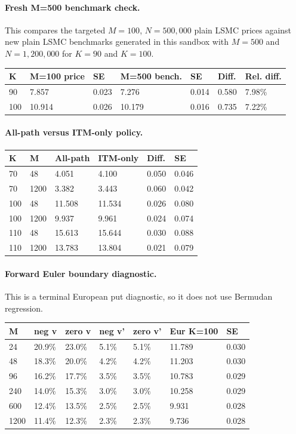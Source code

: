 \documentclass{article}
\begin{document}
\paragraph{Fresh M=500 benchmark check.}
This compares the targeted $M=100$, $N=500{,}000$ plain LSMC prices against new plain LSMC benchmarks generated in this sandbox with $M=500$ and $N=1{,}200{,}000$ for $K=90$ and $K=100$.

\begin{tabular}{lllllll}
\toprule
K & M=100 price & SE & M=500 bench. & SE & Diff. & Rel. diff. \\
\midrule
90 & 7.857 & 0.023 & 7.276 & 0.014 & 0.580 & 7.98\% \\
100 & 10.914 & 0.026 & 10.179 & 0.016 & 0.735 & 7.22\% \\
\bottomrule
\end{tabular}

\paragraph{All-path versus ITM-only policy.}

\begin{tabular}{llllll}
\toprule
K & M & All-path & ITM-only & Diff. & SE \\
\midrule
70 & 48 & 4.051 & 4.100 & 0.050 & 0.046 \\
70 & 1200 & 3.382 & 3.443 & 0.060 & 0.042 \\
100 & 48 & 11.508 & 11.534 & 0.026 & 0.080 \\
100 & 1200 & 9.937 & 9.961 & 0.024 & 0.074 \\
110 & 48 & 15.613 & 15.644 & 0.030 & 0.088 \\
110 & 1200 & 13.783 & 13.804 & 0.021 & 0.079 \\
\bottomrule
\end{tabular}

\paragraph{Forward Euler boundary diagnostic.}
This is a terminal European put diagnostic, so it does not use Bermudan regression.

\begin{tabular}{lllllll}
\toprule
M & neg v & zero v & neg v' & zero v' & Eur K=100 & SE \\
\midrule
24 & 20.9\% & 23.0\% & 5.1\% & 5.1\% & 11.789 & 0.030 \\
48 & 18.3\% & 20.0\% & 4.2\% & 4.2\% & 11.203 & 0.030 \\
96 & 16.2\% & 17.7\% & 3.5\% & 3.5\% & 10.783 & 0.029 \\
240 & 14.0\% & 15.3\% & 3.0\% & 3.0\% & 10.258 & 0.029 \\
600 & 12.4\% & 13.5\% & 2.5\% & 2.5\% & 9.931 & 0.028 \\
1200 & 11.4\% & 12.3\% & 2.3\% & 2.3\% & 9.736 & 0.028 \\
\bottomrule
\end{tabular}
\end{document}
